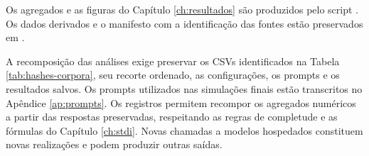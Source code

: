 Os agregados e as figuras do Capítulo \ref{ch:resultados} são produzidos pelo script . Os dados derivados e o manifesto com a identificação das fontes estão preservados em .

A recomposição das análises exige preservar os CSVs identificados na Tabela \ref{tab:hashes-corpora}, seu recorte ordenado, as configurações, os prompts e os resultados salvos. Os prompts utilizados nas simulações finais estão transcritos no Apêndice \ref{ap:prompts}. Os registros permitem recompor os agregados numéricos a partir das respostas preservadas, respeitando as regras de completude e as fórmulas do Capítulo \ref{ch:stdi}. Novas chamadas a modelos hospedados constituem novas realizações e podem produzir outras saídas.
